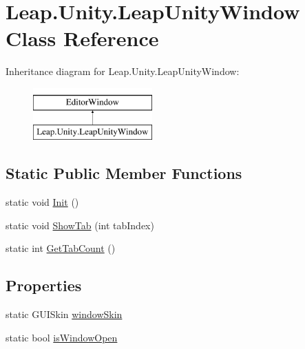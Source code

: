 \hypertarget{class_leap_1_1_unity_1_1_leap_unity_window}{}\section{Leap.\+Unity.\+Leap\+Unity\+Window Class Reference}
\label{class_leap_1_1_unity_1_1_leap_unity_window}
Inheritance diagram for Leap.\+Unity.\+Leap\+Unity\+Window\+:\begin{figure}[H]
\begin{center}
\leavevmode
\includegraphics[height=2.000000cm]{class_leap_1_1_unity_1_1_leap_unity_window}
\end{center}
\end{figure}
\subsection*{Static Public Member Functions}
\begin{DoxyCompactItemize}
\item 
static void \mbox{\hyperlink{class_leap_1_1_unity_1_1_leap_unity_window_a23365de0fb2b614ce387eb2b97feb8a9}{Init}} ()
\item 
static void \mbox{\hyperlink{class_leap_1_1_unity_1_1_leap_unity_window_a98239c66f391636c27540d9ab60e99a4}{Show\+Tab}} (int tab\+Index)
\item 
static int \mbox{\hyperlink{class_leap_1_1_unity_1_1_leap_unity_window_aa6f053a75ac307fc50ef1bdc9bcf5fed}{Get\+Tab\+Count}} ()
\end{DoxyCompactItemize}
\subsection*{Properties}
\begin{DoxyCompactItemize}
\item 
static G\+U\+I\+Skin \mbox{\hyperlink{class_leap_1_1_unity_1_1_leap_unity_window_a52ba0d06fb0957e6a5e608fb4164b5e8}{window\+Skin}}
\item 
static bool \mbox{\hyperlink{class_leap_1_1_unity_1_1_leap_unity_window_aab787ca9a41ea00fa31ab7e478e95628}{is\+Window\+Open}}
\end{DoxyCompactItemize}


